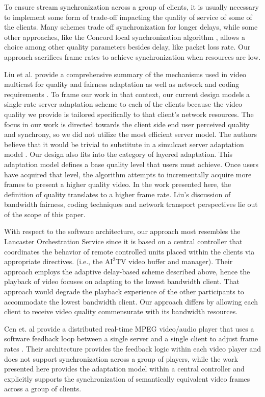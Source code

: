 \documentclass{sig-alternate}
\begin{document}
To ensure stream synchronization across a group of clients, it is
usually necessary to implement some form of trade-off impacting the
quality of service of some of the clients.  Many schemes trade off
synchronization for longer delays, while some other approaches, like
the Concord local synchronization algorithm \cite{Concord}, allows a
choice among other quality parameters besides delay, like packet loss
rate.  Our approach sacrifices frame rates to achieve synchronization
when resources are low.

Liu et al. provide a comprehensive summary of the mechanisms used in
video multicast for quality and fairness adaptation as well as network
and coding requirements \cite{LIU}.  To frame our work in that
context, our current design models a single-rate server adaptation
scheme to each of the clients because the video quality we provide is
tailored specifically to that client's network resources.  The focus
in our work is directed towards the client side end user perceived
quality and synchrony, so we did not utilize the most efficient server
model.  The authors believe that it would be trivial to substitute in
a simulcast server adaptation model \cite{CHEUNG,LI}.  Our design also
fits into the category of layered adaptation.  This adaptation model
defines a base quality level that users must achieve.  Once users have
acquired that level, the algorithm attempts to incrementally acquire
more frames to present a higher quality video.  In the work presented
here, the definition of quality translates to a higher frame rate.
Liu's discussion of bandwidth fairness, coding techniques and network
transport perspectives lie out of the scope of this paper.

With respect to the software architecture, our approach most resembles
the Lancaster Orchestration Service \cite{Lancaster} since it is based
on a central controller that coordinates the behavior of remote
controlled units placed within the clients via appropriate directives.
(i.e., the $\mathrm{AI}^2$TV video buffer and manager).  Their
approach employs the adaptive delay-based scheme described above,
hence the playback of video focuses on adapting to the lowest
bandwidth client.  That approach would degrade the playback experience
of the other participants to accommodate the lowest bandwidth client.
Our approach differs by allowing each client to receive video quality
commensurate with its bandwidth resources.

Cen et. al provide a distributed real-time MPEG video/audio player
that uses a software feedback loop between a single server and a
single client to adjust frame rates \cite{CEN}.  Their architecture
provides the feedback logic within each video player and does not
support synchronization across a group of players, while the work
presented here provides the adaptation model within a central
controller and explicitly supports the synchronization of semantically
equivalent video frames across a group of clients.
\end{document}
